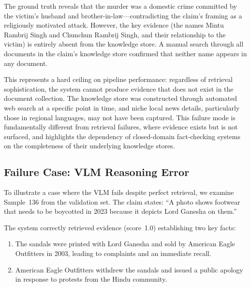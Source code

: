 The ground truth reveals that the murder was a domestic crime committed by the victim's husband and brother-in-law---contradicting the claim's framing as a religiously motivated attack. However, the key evidence (the names Mintu Rambrij Singh and Chunchun Rambrij Singh, and their relationship to the victim) is entirely absent from the knowledge store. A manual search through all documents in the claim's knowledge store confirmed that neither name appears in any document.

This represents a hard ceiling on pipeline performance: regardless of retrieval sophistication, the system cannot produce evidence that does not exist in the document collection. The knowledge store was constructed through automated web search at a specific point in time, and niche local news details, particularly those in regional languages, may not have been captured. This failure mode is fundamentally different from retrieval failures, where evidence exists but is not surfaced, and highlights the dependency of closed-domain fact-checking systems on the completeness of their underlying knowledge stores.

\subsection{Failure Case: VLM Reasoning Error}

To illustrate a case where the VLM fails despite perfect retrieval, we examine Sample~136 from the validation set. The claim states: ``A photo shows footwear that needs to be boycotted in 2023 because it depicts Lord Ganesha on them.''

The system correctly retrieved evidence (score~1.0) establishing two key facts:

\begin{enumerate}
    \item The sandals were printed with Lord Ganesha and sold by American Eagle Outfitters in 2003, leading to complaints and an immediate recall.
    \item American Eagle Outfitters withdrew the sandals and issued a public apology in response to protests from the Hindu community.
\end{enumerate}


